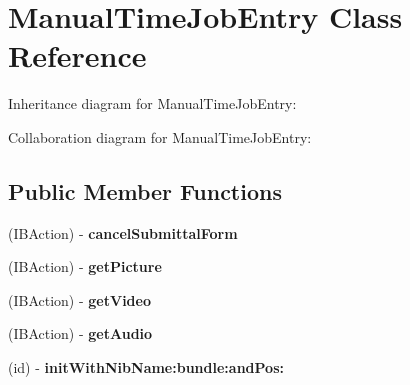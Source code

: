 \hypertarget{interface_manual_time_job_entry}{
\section{\-Manual\-Time\-Job\-Entry \-Class \-Reference}
\label{interface_manual_time_job_entry}
}


\-Inheritance diagram for \-Manual\-Time\-Job\-Entry\-:


\-Collaboration diagram for \-Manual\-Time\-Job\-Entry\-:
\subsection*{\-Public \-Member \-Functions}
\begin{DoxyCompactItemize}
\item 
\hypertarget{interface_manual_time_job_entry_a83952d266aa005daee21147b4032c013}{
(\-I\-B\-Action) -\/ {\bfseries cancel\-Submittal\-Form}}
\label{interface_manual_time_job_entry_a83952d266aa005daee21147b4032c013}

\item 
\hypertarget{interface_manual_time_job_entry_ae71abe18cef3b4672a66316dc182b34e}{
(\-I\-B\-Action) -\/ {\bfseries get\-Picture}}
\label{interface_manual_time_job_entry_ae71abe18cef3b4672a66316dc182b34e}

\item 
\hypertarget{interface_manual_time_job_entry_a6b29ca5429e95cd08db54fade93e5808}{
(\-I\-B\-Action) -\/ {\bfseries get\-Video}}
\label{interface_manual_time_job_entry_a6b29ca5429e95cd08db54fade93e5808}

\item 
\hypertarget{interface_manual_time_job_entry_a30acf352cc6e61b429afa7904434b7b1}{
(\-I\-B\-Action) -\/ {\bfseries get\-Audio}}
\label{interface_manual_time_job_entry_a30acf352cc6e61b429afa7904434b7b1}

\item 
\hypertarget{interface_manual_time_job_entry_a29a78c27036ff57e4102ddd7fcdc5644}{
(id) -\/ {\bfseries init\-With\-Nib\-Name\-:bundle\-:and\-Pos\-:}}
\label{interface_manual_time_job_entry_a29a78c27036ff57e4102ddd7fcdc5644}

\end{DoxyCompactItemize}
